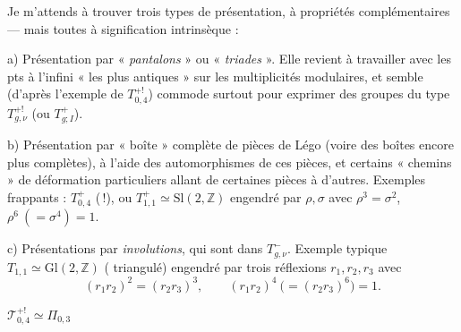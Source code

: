 \documentclass[11pt,a4paper]{article}
\begin{document}
Je m'attends à trouver trois types de présentation, à propriétés complémentaires --- mais toutes à signification intrinsèque :

a) Présentation par « \emph{pantalons} » ou « \emph{triades} ». Elle revient à travailler avec les pts à l'infini « les plus antiques » sur les multiplicités modulaires, et semble (d'après l'exemple de $T^{+!}_{0,4}$) commode surtout pour exprimer des groupes du type $T^{+!}_{g,\nu}$ (ou $T^{+}_{g;I}$).

b) Présentation par « boîte » complète de pièces de Légo (voire des boîtes encore plus complètes), à l'aide des  automorphismes de ces pièces, et certains « chemins » de déformation particuliers allant de certaines pièces à d'autres. Exemples frappants : $T^{+}_{0,4}$ (\,!), ou $T^{+}_{1,1} \simeq \mathrm{Sl}(2,\mathbb{Z})$ engendré par $\rho, \sigma$ avec $\rho^{3} = \sigma^{2}$, $\rho^{6}\ (= \sigma^{4}) = 1$.

c) Présentations par \emph{involutions}, qui sont dans $T^{-}_{g,\nu}$. Exemple typique $T_{1,1} \simeq \mathrm{Gl}(2,\mathbb{Z})$ \struck{\ill{}} (\struck{\ill{}}  triangulé) engendré par trois réflexions $r_1, r_2, r_3$ avec
\[
  (r_1 r_2)^{2} = (r_2 r_3)^{3}, \qquad (r_1 r_2)^{4}\ \bigl(= (r_2 r_3)^{6}\bigr) = 1 .
\]


$\mathcal{T}^{+!}_{0,4} \simeq \Pi_{0,3}$ \struck{\ill{}}

\end{document}
